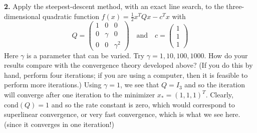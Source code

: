 \documentclass{article}
\begin{document}
\textbf{2.} Apply the steepest-descent method, with an exact line search, to the three-dimensional quadratic function $f(x) = \frac{1}{2}x^TQx - c^Tx$ with
\[Q = \begin{pmatrix}
    1 & 0 & 0\\
    0 & \gamma & 0\\
    0 & 0 & \gamma^2
\end{pmatrix} \hspace{1em} 
\text{and} \hspace{1em} 
c = \begin{pmatrix}
    1\\
    1\\
    1
\end{pmatrix}\]
Here $\gamma$ is a parameter that can be varied. Try $\gamma = 1,10,100,1000.$ How do your results compare with the convergence theory developed above? (If you do this by hand, perform four iterations; if you are using a computer, then it is feasible to perform more iterations.)
\newline\newline
Using $\gamma = 1$, we see that $Q = I_3$ and so the iteration will converge after one iteration to the minimizer $x_* = (1,1,1)^T$. Clearly, $\text{cond}(Q) = 1$ and so the rate constant is zero, which would correspond to superlinear convergence, or very fast convergence, which is what we see here. (since it converges in one iteration!)
\newline
\end{document}
